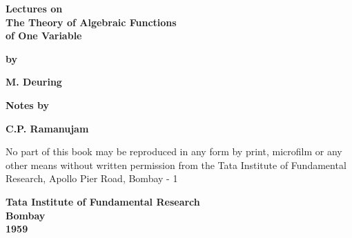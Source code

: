 \thispagestyle{empty}
\vfill


\begin{center}
{\Large\bf Lectures on}\\[5pt]
{\Large\bf The Theory of Algebraic Functions}\\[5pt] 
{\Large\bf of One Variable}
\vskip 1cm

{\bf by}
\medskip

{\large\bf M. Deuring}

\vskip 1cm

{\bf Notes by}
\medskip

{\large\bf C.P. Ramanujam}


\vfill



\parbox{0.7\textwidth}{No part of this book may be reproduced in any 
form by print, microfilm or any other means without written permission
from the Tata Institute of Fundamental Research, Apollo Pier Road,
Bombay - 1   }
\vfill 



{\bf Tata Institute of Fundamental Research}\\

{\bf Bombay}\\

{\bf 1959}
\end{center}

